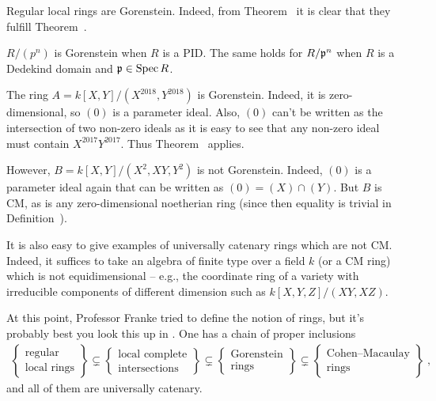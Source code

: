 \documentclass[a4paper,parskip=half,numbers=enddot, DIV=12]{scrreprt}
\begin{document}
\begin{example*}
	\begin{alphanumerate}
		\item Regular local rings are Gorenstein. Indeed, from Theorem~ it is clear that they fulfill Theorem~.
		\item $R/(p^n)$ is Gorenstein when $R$ is a PID. The same holds for $R/\mathfrak{p}^n$ when $R$ is a Dedekind domain and $\mathfrak{p}\in\operatorname{Spec} R$.
		\item The ring $A=k[X,Y]/(X^{2018},Y^{2018})$ is Gorenstein. Indeed, it is zero-dimensional, so $(0)$ is a parameter ideal. Also, $(0)$ can't be written as the intersection of two non-zero ideals as it is easy to see that any non-zero ideal must contain $X^{2017}Y^{2017}$. Thus Theorem~ applies.
		
		However, $B=k[X,Y]/(X^2,XY,Y^2)$ is not Gorenstein. Indeed, $(0)$ is a parameter ideal again that can be written as $(0)=(X)\cap (Y)$. But $B$ is CM, as is any zero-dimensional noetherian ring (since then equality is trivial in Definition~).
		
		It is also easy to give examples of universally catenary rings which are not CM. Indeed, it suffices to take an algebra of finite type over a field $k$ (or a CM ring) which is not equidimensional -- e.g., the coordinate ring of a variety with irreducible components of different dimension such as $k[X,Y,Z]/(XY,XZ)$.
	\end{alphanumerate}
\end{example*}
At this point, Professor Franke tried to define the notion of  rings, but it's probably best you look this up in \cite[\S 21]{matsumuraCRT}. One has a chain of proper inclusions
\begin{align*}
	\left\{\begin{array}{c}
		\text{regular}\\
		\text{local rings}
	\end{array}\right\}\subsetneq 
	\left\{\begin{array}{c}
	\text{local complete}\\
	\text{intersections}
	\end{array}\right\}\subsetneq
	\left\{\begin{array}{c}
	\text{Gorenstein}\\
	\text{rings}
	\end{array}\right\}\subsetneq
	\left\{\begin{array}{c}
	\text{Cohen--Macaulay}\\
	\text{rings}
	\end{array}\right\}\;,
\end{align*}
and all of them are universally catenary.
\end{document}
